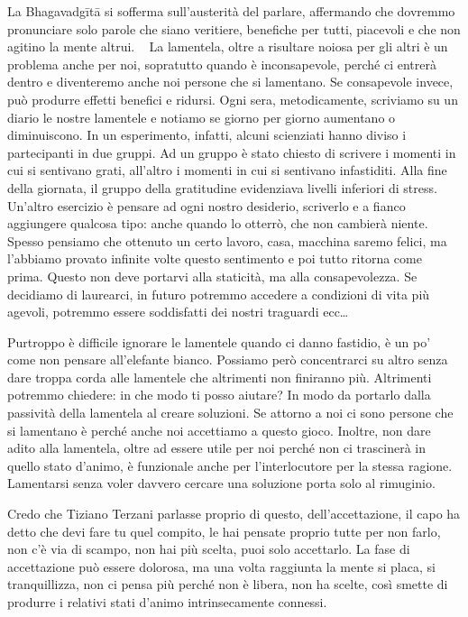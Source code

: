 \documentclass[12pt]{book} %
\begin{document}
\begin{mdframed}[linewidth=1pt]
La Bhagavadgītā si sofferma sull'austerità del parlare, affermando che dovremmo pronunciare solo
parole che siano veritiere, benefiche per tutti, piacevoli e che non agitino la mente altrui. \ \newline
\newline
La lamentela, oltre a risultare noiosa per gli altri è un problema anche per noi, sopratutto quando è inconsapevole,
perché ci entrerà dentro e diventeremo anche noi persone che si 
lamentano. Se consapevole invece, può produrre effetti benefici
e ridursi. Ogni sera, metodicamente, scriviamo su un diario le nostre lamentele e notiamo se giorno per giorno
aumentano o diminuiscono. In un esperimento, infatti, alcuni scienziati hanno diviso i partecipanti in due gruppi. Ad
un gruppo è stato chiesto di scrivere i momenti in cui si sentivano grati, all'altro i momenti in
cui si sentivano infastiditi. Alla fine della giornata, il gruppo della gratitudine evidenziava livelli inferiori di
stress.
Un'altro esercizio è pensare ad ogni nostro desiderio, scriverlo e a fianco aggiungere qualcosa tipo: anche quando lo otterrò, che non cambierà niente.
Spesso pensiamo che ottenuto un certo lavoro, casa, macchina saremo felici, ma l'abbiamo provato infinite volte questo sentimento e poi tutto ritorna come prima. Questo non deve portarvi alla staticità, ma alla consapevolezza. Se decidiamo di laurearci, in futuro potremmo accedere a condizioni di vita più agevoli, potremmo essere soddisfatti dei nostri traguardi ecc…

Purtroppo è difficile ignorare le lamentele quando ci danno fastidio, è un po' come non pensare
all'elefante bianco. Possiamo però concentrarci su altro senza dare troppa corda alle lamentele
che altrimenti non finiranno più. Altrimenti potremmo chiedere: in che modo ti posso aiutare? In modo da portarlo dalla
passività della lamentela al creare soluzioni. Se attorno a noi ci sono persone che si lamentano è perché anche noi
accettiamo a questo gioco. Inoltre, non dare adito alla lamentela, oltre ad essere utile per noi perché non ci
trascinerà in quello stato d'animo, è funzionale anche per l'interlocutore
per la stessa ragione. Lamentarsi senza voler davvero cercare una soluzione porta solo al rimuginio.
\end{mdframed}

Credo che Tiziano Terzani parlasse proprio di questo, dell'accettazione, il capo ha detto che devi
fare tu quel compito, le hai pensate proprio tutte per non farlo, non c'è via di scampo, non hai
più scelta, puoi solo accettarlo. La fase di accettazione può essere dolorosa, ma una volta raggiunta la mente si
placa, si tranquillizza, non ci pensa più perché non è libera, non ha scelte, così smette di produrre i relativi stati
d'animo intrinsecamente connessi.
\end{document}
